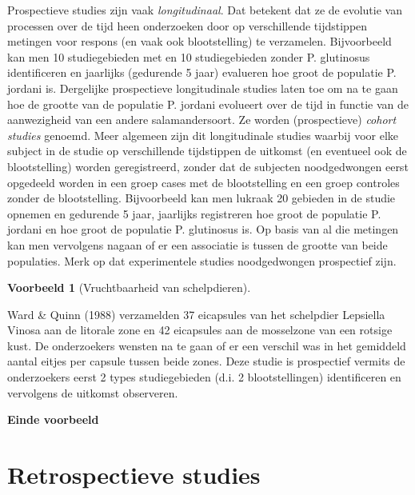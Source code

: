\documentclass[
  12pt,dutch,coursenotes]{book}
\theoremstyle{definition}
\theoremstyle{definition}
\newtheorem{example}{Voorbeeld}[chapter]
\theoremstyle{definition}
\theoremstyle{definition}
\theoremstyle{remark}
\begin{document}
Prospectieve studies zijn vaak \emph{longitudinaal}. Dat betekent dat ze
de evolutie van processen over de tijd heen onderzoeken door op
verschillende tijdstippen metingen voor respons (en vaak ook blootstelling) te
verzamelen. Bijvoorbeeld kan men 10 studiegebieden met en 10 studiegebieden zonder P. glutinosus identificeren en jaarlijks (gedurende 5 jaar) evalueren hoe groot de populatie P. jordani is. Dergelijke prospectieve longitudinale studies laten toe om na te gaan hoe de grootte van de populatie P. jordani evolueert over de tijd in functie van de aanwezigheid van een andere salamandersoort. Ze
worden (prospectieve) \emph{cohort studies} genoemd. Meer algemeen zijn
dit longitudinale studies waarbij voor elke subject in de studie op
verschillende tijdstippen de uitkomst (en eventueel ook de blootstelling) worden geregistreerd,
zonder dat de subjecten noodgedwongen eerst opgedeeld worden in een groep
cases met de blootstelling en een groep controles zonder de blootstelling.
Bijvoorbeeld kan men lukraak 20 gebieden in de studie
opnemen en gedurende 5 jaar, jaarlijks registreren hoe groot de populatie P. jordani en hoe groot de populatie P. glutinosus is. Op
basis van al die metingen kan men vervolgens nagaan of er een associatie is
tussen de grootte van beide populaties. Merk op dat experimentele studies noodgedwongen prospectief zijn.

\begin{example}[Vruchtbaarheid van schelpdieren]
\protect\hypertarget{exm:unnamed-chunk-85}{}{\label{exm:unnamed-chunk-85} {} }
\end{example}

Ward \& Quinn (1988) verzamelden 37 eicapsules van het schelpdier Lepsiella Vinosa aan de litorale zone en 42 eicapsules aan de mosselzone van een rotsige kust. De onderzoekers wensten na te gaan of er een verschil was in het gemiddeld aantal eitjes per capsule tussen beide zones. Deze studie is prospectief vermits de onderzoekers eerst 2 types studiegebieden (d.i. 2 blootstellingen) identificeren en vervolgens de uitkomst observeren.

\textbf{Einde voorbeeld}

\hypertarget{subsec:design:retro}{%
\section{Retrospectieve studies}\label{subsec:design:retro}}
\end{document}
